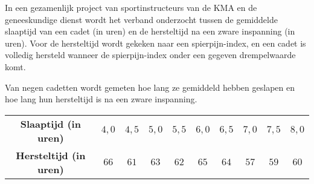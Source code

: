\begin{question}{30}{
    In een gezamenlijk project van sportinstructeurs van de KMA en de geneeskundige dienst wordt het verband onderzocht tussen de gemiddelde slaaptijd van een cadet (in uren) en de hersteltijd na een zware inspanning (in uren).
    Voor de hersteltijd wordt gekeken naar een spierpijn-index, en een cadet is volledig hersteld wanneer de spierpijn-index onder een gegeven drempelwaarde komt.

    Van negen cadetten wordt gemeten hoe lang ze gemiddeld hebben geslapen en hoe lang hun hersteltijd is na een zware inspanning.
    \begin{center}
        \begin{tabular}{c|ccccccccc}
            \toprule
                \textbf{Slaaptijd (in uren)} & $4,0$ & $4,5$ & $5,0$ & $5,5$ & $6,0$ & $6,5$ & $7,0$ & $7,5$ & $8,0$ \\
                \textbf{Hersteltijd (in uren)} & $66$ & $61$ & $63$ & $62$ & $65$ & $64$ & $57$ & $59$ & $60$ \\
            \bottomrule
        \end{tabular}
    \end{center}
}
    


\end{question}
